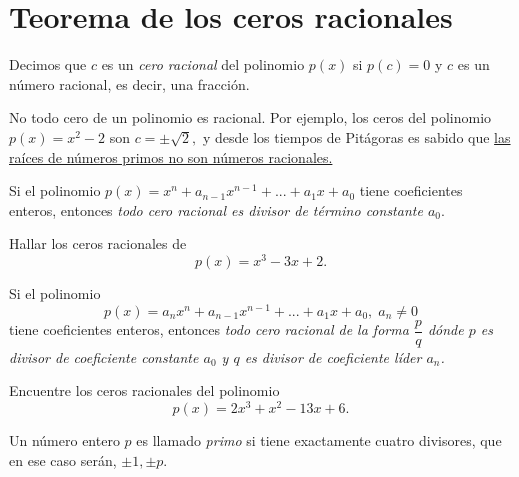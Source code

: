 
\section{Teorema de los ceros racionales}


	Decimos que $c$ es un \emph{cero racional} del polinomio $p(x)$ si $p(c)=0$ y $c$ es un número racional, es decir, una fracci\'on.



	\begin{observacion}
		No todo cero de un polinomio es racional. Por ejemplo, los ceros del polinomio $p(x)=x^{2}-2$ son $c=\pm\sqrt{2},$ y desde los tiempos de Pitágoras es sabido que \href{https://www.youtube.com/watch?v=gVkB3XuK6MU}{las ra\'ices de números primos no son números racionales.}
	\end{observacion}
	




	\begin{teorema}
		Si el polinomio {\color{blue}$p(x)=x^{n}+a_{n-1}x^{n-1}+...+a_{1}x+a_{0}$} tiene {\color{green}coeficientes enteros}, entonces \emph{todo cero racional es divisor de t\'ermino constante $a_{0}.$}
	\end{teorema}
	



	\begin{problema}
		Hallar los ceros racionales de 
		$$
		p(x)=x^{3}-3x+2.
		$$
	\end{problema}
	



	\begin{teorema}
		Si el polinomio {\color{blue}$$p(x)=a_{n}x^{n}+a_{n-1}x^{n-1}+...+a_{1}x+a_{0}, \; a_{n}\neq 0$$} tiene {\color{green}coeficientes enteros}, entonces \emph{todo cero racional de la forma $\displaystyle\dfrac{p}{q}$ d\'onde $p$ es divisor de coeficiente constante $a_{0}$ y $q$ es divisor de coeficiente l\'ider $a_{n}$.} 
	\end{teorema}



	\begin{problema}
		Encuentre los ceros racionales del polinomio $$p(x)=2x^{3}+x^{2}-13x+6.$$
	\end{problema}
	



 	\begin{definicion}
 		Un número entero $p$ es llamado \emph{primo} si tiene exactamente cuatro divisores, que en ese caso serán, $\pm 1, \pm p.$  
 	\end{definicion}
 

